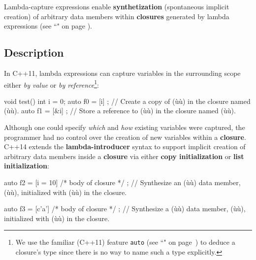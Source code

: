 
\setcounter{table}{0}
\setcounter{footnote}{0}
\setcounter{lstlisting}{0}

Lambda-capture expressions enable \textbf{synthetization} (spontaneous implicit creation) of
arbitrary data members within \textbf{closures} generated by
lambda expressions (see ``" on page \pageref{lambda}).

\subsection[Description]{Description}\label{description}

In C++11, lambda expressions can capture variables in the
surrounding scope either \emph{by value} or \emph{by reference}{\cprotect\footnote{We use the familiar (C++11) feature
  \texttt{auto} (see ``" on page~\pageref{auto-feature}) to deduce a closure's type since there is no
  way to name such a type explicitly.}}:

\begin{emcppslisting}
void test()
{
    int i = 0;
    auto f0 = [i]{ };   // Create a copy of (ù{}ù) in the closure named (ù{}ù).
    auto f1 = [&i]{ };  // Store a reference to (ù{}ù) in the closure named (ù{}ù).
}
\end{emcppslisting}
    
\noindent Although one could specify \emph{which} and \emph{how} existing
variables were captured, the programmer had no control over the creation
of new variables within a \textbf{closure}. C++14 extends the
\textbf{lambda-introducer} syntax to support implicit creation of
arbitrary data members inside a \textbf{closure} via either \textbf{copy
initialization} or \textbf{list initialization}:

\begin{emcppslisting}[emcppsstandards={c++14}]
auto f2 = [i = 10]{ /* body of closure */ };
    // Synthesize an (ù{}ù) data member, (ù{}ù), initialized with (ù{}ù) in the closure.

auto f3 = [c{'a'}]{ /* body of closure */ };
    // Synthesize a (ù{}ù) data member, (ù{}ù), initialized with (ù{}ù) in the closure.
\end{emcppslisting}
    
